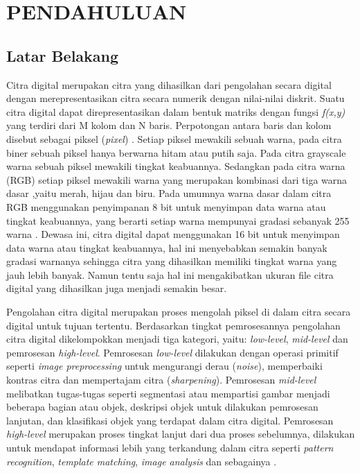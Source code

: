 \chapter{PENDAHULUAN}

\section{Latar Belakang}
Citra digital merupakan citra yang dihasilkan dari pengolahan secara digital dengan merepresentasikan citra secara numerik dengan nilai-nilai diskrit. Suatu citra digital dapat direpresentasikan dalam bentuk matriks dengan fungsi \textit{f(x,y)} yang terdiri dari M kolom dan N baris. Perpotongan antara baris dan kolom disebut sebagai piksel (\textit{pixel}) . Setiap piksel mewakili sebuah warna, pada citra biner sebuah piksel hanya berwarna hitam atau putih saja. Pada citra grayscale warna sebuah piksel mewakili tingkat keabuannya. Sedangkan pada citra warna (RGB) setiap piksel mewakili warna yang merupakan kombinasi dari tiga warna dasar ,yaitu merah, hijau dan biru. Pada umumnya warna dasar dalam citra RGB menggunakan penyimpanan 8 bit untuk menyimpan data warna atau tingkat keabuannya, yang berarti setiap warna mempunyai gradasi sebanyak 255 warna . Dewasa ini, citra digital dapat menggunakan 16 bit untuk menyimpan data warna atau tingkat keabuannya, hal ini menyebabkan semakin banyak gradasi warnanya sehingga citra yang dihasilkan memiliki tingkat warna yang jauh lebih banyak. Namun tentu saja hal ini mengakibatkan ukuran file citra digital yang dihasilkan juga menjadi semakin besar.

Pengolahan citra digital merupakan proses mengolah piksel di dalam citra secara digital untuk tujuan tertentu. Berdasarkan tingkat pemrosesannya pengolahan citra digital dikelompokkan menjadi tiga kategori, yaitu: \textit{low-level}, \textit{mid-level} dan pemrosesan \textit{high-level}. Pemrosesan \textit{low-level} dilakukan dengan operasi primitif seperti \textit{image preprocessing} untuk mengurangi derau (\textit{noise}), memperbaiki kontras citra dan mempertajam citra (\textit{sharpening}). Pemrosesan \textit{mid-level} melibatkan tugas-tugas seperti segmentasi atau mempartisi gambar menjadi beberapa bagian atau objek, deskripsi objek untuk dilakukan pemrosesan lanjutan, dan klasifikasi objek yang terdapat dalam citra digital. Pemrosesan \textit{high-level} merupakan proses tingkat lanjut dari dua proses sebelumnya, dilakukan untuk mendapat informasi lebih yang terkandung dalam citra seperti \textit{pattern recognition}, \textit{template matching}, \textit{image analysis} dan sebagainya .


